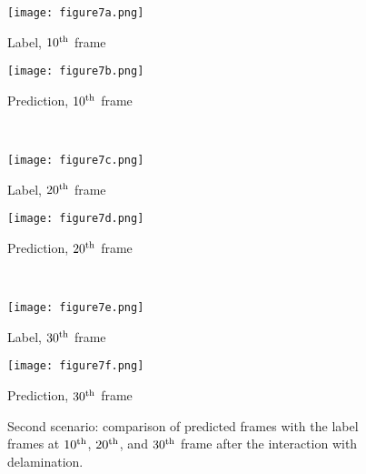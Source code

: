 \documentclass[sn-mathphys-num]{sn-jnl}%
\begin{document}
\begin{figure}
	\centering
	\begin{minipage}[b]{0.44\textwidth}
		\centering
		\texttt{[image: figure7a.png]}
		\caption*{Label, $10\textsuperscript{th}$ frame}
		\label{fig:num_453_label1}
	\end{minipage}
	\hfill
	\begin{minipage}[b]{0.44\textwidth}
		\centering
		\texttt{[image: figure7b.png]}
		\caption*{Prediction, $10\textsuperscript{th}$ frame}
		\label{fig:num_453_pred1}
	\end{minipage}
	\\
	\begin{minipage}[b]{0.44\textwidth}
		\centering
		\texttt{[image: figure7c.png]}
		\caption*{Label, $20\textsuperscript{th}$ frame}
		\label{fig:num_453_label2}
	\end{minipage}
	\hfill
	\begin{minipage}[b]{0.44\textwidth}
		\centering
		\texttt{[image: figure7d.png]}
		\caption*{Prediction, $20\textsuperscript{th}$ frame}
		\label{fig:num_453_pred2}
	\end{minipage}
	\\
	\begin{minipage}[b]{0.44\textwidth}
		\centering
		\texttt{[image: figure7e.png]}
		\caption*{Label, $30\textsuperscript{th}$ frame}
		\label{fig:num_453_label3}
	\end{minipage}
	\hfill
	\begin{minipage}[b]{0.44\textwidth}
		\centering
		\texttt{[image: figure7f.png]}
		\caption*{Prediction, $30\textsuperscript{th}$ frame}
		\label{fig:num_453_pred3}
	\end{minipage}
	\caption{Second scenario: comparison of predicted frames with the label 
	frames at $10\textsuperscript{th}$, $20\textsuperscript{th}$, and 
	$30\textsuperscript{th}$ frame after the interaction with 
	delamination.}
\label{fig:num_453}
\end{figure}
\end{document}
